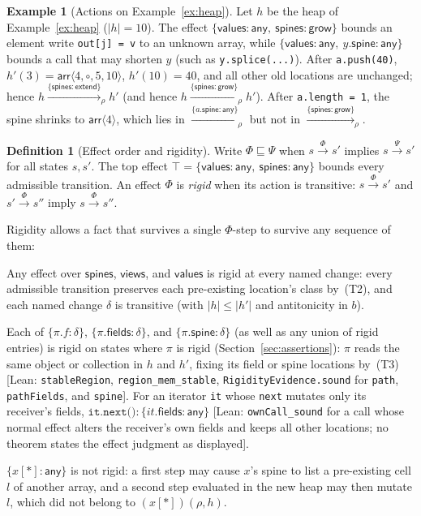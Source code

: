 \documentclass[10pt,a4paper]{article}
\theoremstyle{definition}
\newtheorem{definition}[theorem]{Definition}
\newtheorem{example}[theorem]{Example}
\theoremstyle{remark}
\newcommand{\kw}[1]{\mathsf{#1}}
\newcommand{\extend}{\kw{extend}}
\newcommand{\grow}{\kw{grow}}
\newcommand{\any}{\kw{any}}
\newcommand{\val}{\kw{values}}
\newcommand{\st}{\kw{spines}}
\newcommand{\vw}{\kw{views}}
\newcommand{\len}[1]{|#1|}
\newcommand{\tr}[1]{\xrightarrow{#1}}
\newcommand{\code}[1]{\texttt{#1}}
\newcommand{\lean}[1]{\texttt{\small #1}}
\newcommand{\status}[1]{\textsf{\small[#1]}}
\begin{document}
\begin{example}[Actions on Example~\ref{ex:heap}]
Let $h$ be the heap of Example~\ref{ex:heap} ($\len h=10$). The effect
$\{\val:\any,\ \st:\grow\}$ bounds an element write \code{out[j] = v} to
an unknown array, while $\{\val:\any,\ y.\kw{spine}:\any\}$ bounds a call
that may shorten $y$ (such as \code{y.splice(...)}). After
\code{a.push(40)}, $h'(3)=\mathsf{arr}\langle 4,\circ,5,10\rangle$, $h'(10)=40$, and
all other old locations are unchanged; hence
$h\tr{\{\st:\extend\}}_\rho h'$ (and hence $h\tr{\{\st:\grow\}}_\rho h'$).
After \code{a.length = 1}, the spine shrinks to $\mathsf{arr}\langle 4\rangle$,
which lies in $\tr{\{a.\kw{spine}:\any\}}_\rho$ but not in $\tr{\{\st:\grow\}}_\rho$.
\end{example}

\begin{definition}[Effect order and rigidity]\label{def:rigidity}
Write $\Phi\sqsubseteq\Psi$ when $s\tr{\Phi} s'$ implies
$s\tr{\Psi} s'$ for all states $s,s'$. The top effect
$\top=\{\val:\any,\ \st:\any\}$ bounds every admissible transition.
An effect $\Phi$ is \emph{rigid} when its action is transitive:
$s\tr{\Phi} s'$ and $s'\tr{\Phi} s''$ imply
$s\tr{\Phi} s''$.
\end{definition}

\noindent
Rigidity allows a fact that survives a single $\Phi$-step to survive any
sequence of them:
\begin{description}[leftmargin=1.5em,style=nextline]
\item[Rigid: class regions] Any effect over $\st$, $\vw$, and $\val$ is
rigid at every named change: every admissible transition preserves each
pre-existing location's class by~(T2), and each named change $\delta$ is
transitive (with $\len h\le\len{h'}$ and antitonicity in $b$).
\item[Rigid: field, fields, or spine at a rigid path] Each of
$\{\pi.f:\delta\}$, $\{\pi.\kw{fields}:\delta\}$, and
$\{\pi.\kw{spine}:\delta\}$ (as well as any union of rigid entries) is
rigid on states where $\pi$ is rigid (Section~\ref{sec:assertions}): $\pi$
reads the same object or collection in $h$ and $h'$, fixing its field or
spine locations by~(T3)
\status{Lean: \lean{stableRegion}, \lean{region\_mem\_stable}, \lean{RigidityEvidence.sound} for \lean{path}, \lean{pathFields}, and \lean{spine}}.
For an iterator \code{it} whose \code{next} mutates only its receiver's
fields, $\code{it.next()}:\{\mathit{it}.\kw{fields}:\any\}$
\status{Lean: \lean{ownCall\_sound} for a call whose normal effect alters the receiver's own fields and keeps all other locations; no theorem states the effect judgment as displayed}.
\item[Not rigid: cells under $\any$] $\{x[\ast]:\any\}$ is not rigid: a
first step may cause $x$'s spine to list a pre-existing cell $l$ of
another array, and a second step evaluated in the new heap may then
mutate $l$, which did not belong to $(x[\ast])(\rho,h)$.
\end{description}
\end{document}
